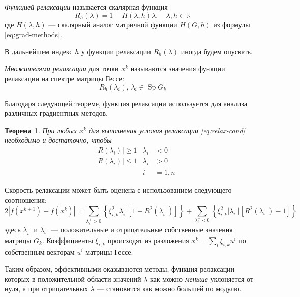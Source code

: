 \documentclass{article}
\renewcommand{\leq}{\leqslant}
\renewcommand{\geq}{\geqslant}
\providecommand{\neword}{\emph}
\providecommand{\abs}[1]{\left \lvert{#1}\right \rvert}
\providecommand{\set}[1]{\mathbb{#1}}
\DeclareMathOperator{\Sp}{Sp}
\newtheorem{thm}{Теорема}
\numberwithin{equation}{section}
\begin{document}
\neword{Функцией релаксации} называется скалярная функция
\begin{equation}
  \label{eq:relax-fun}
  R_h(\lambda) = 1 - H(\lambda, h)\lambda,\quad \lambda,h \in \set{R}
\end{equation}
где $H(\lambda, h)$ — скалярный аналог матричной функции $H(G, h)$ из
формулы \eqref{eq:grad-methods}.

В дальнейшем индекс $h$ у функции релаксации $R_h(\lambda)$ иногда
будем опускать.

\neword{Множителями релаксации} для точки $x^k$ называются значения
функции релаксации на спектре матрицы Гессе:
\begin{equation}
  \label{eq:relax-fac}
  R_h(\lambda_i),\, \lambda_i \in \Sp{G_k}
\end{equation}

Благодаря следующей теореме, функция релаксации используется для
анализа различных градиентных методов.

\begin{thm}
  \label{thm:relax-thm}
  При любых $x^k$ для выполнения условия релаксации
  \eqref{eq:relax-cond} необходимо и достаточно, чтобы
  \begin{equation}
    \label{eq:relax-thm}
    \begin{aligned}
      & \abs{R(\lambda_i)} \geq 1 & \lambda_i& < 0 \\
      & \abs{R(\lambda_i)} \leq 1 & \lambda_i& > 0\\
      &&i& = \overline{1, n}
    \end{aligned}
  \end{equation}
\end{thm}




Скорость релаксации может быть оценена с использованием следующего
соотношения:
\begin{equation}
  \label{eq:relax-speed}
  2\abs{f(x^{k+1})-f(x^k)}=\sum_{\lambda_i^+>0} \left\{\xi_{i,k}^2
    \lambda_i^+ [1-R^2(\lambda_i^+)]\right\} + \sum_{\lambda_i^-<0} \left\{\xi_{i,k}^2
    \abs{\lambda_i^-} [R^2(\lambda_i^-)-1]\right\}
\end{equation}
здесь $\lambda_i^+$ и $\lambda_i^-$ — положительные и отрицательные
собственные значения матрицы $G_k$. Коэффициенты $\xi_{i,k}$
происходят из разложения $x^k=\sum_i{\xi_{i,k}u^i}$ по собственным
векторам $u^i$ матрицы Гессе.

Таким образом, эффективными оказываются методы, функция релаксации
которых в положительной области значений $\lambda$ как можно
\emph{меньше} уклоняется от нуля, а при отрицательных $\lambda$ —
становится как можно большей по модулю.
\end{document}
